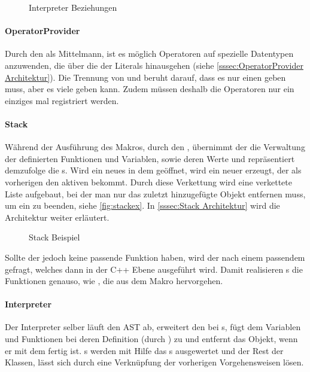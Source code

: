{      \begin{figure}[H]
        \centering
        \caption{Interpreter Beziehungen}
        \label{fig:interpreterpackuml}
      \end{figure}

      \paragraph{OperatorProvider}
        Durch den  als Mittelmann, ist es möglich Operatoren auf spezielle Datentypen anzuwenden, die über die der Literals hinausgehen (siehe \autoref{sssec:OperatorProvider Architektur}). Die Trennung von  und  beruht darauf, dass es nur einen  geben muss, aber es viele  geben kann. Zudem müssen deshalb die Operatoren nur ein einziges mal registriert werden.

      \paragraph{Stack}
        Während der Ausführung des Makros, durch den , übernimmt der  die Verwaltung der definierten Funktionen und Variablen, sowie deren Werte und repräsentiert demzufolge die s. Wird ein neues  in dem  geöffnet, wird ein neuer  erzeugt, der als vorherigen  den aktiven  bekommt. Durch diese Verkettung wird eine verkettete Liste aufgebaut, bei der man nur das zuletzt hinzugefügte Objekt entfernen muss, um ein  zu beenden, siehe \autoref{fig:stackex}. In \autoref{sssec:Stack Architektur} wird die Architektur weiter erläutert.
        \begin{figure}[H]
          \centering
          \caption{Stack Beispiel}
          \label{fig:stackex}
        \end{figure}

        Sollte der  jedoch keine passende Funktion haben, wird der  nach einem passendem  gefragt, welches dann in der C++ Ebene ausgeführt wird. Damit realisieren s die  Funktionen genauso, wie , die aus dem Makro hervorgehen.

      \paragraph{Interpreter}
        Der Interpreter selber läuft den AST ab, erweitert den  bei s, fügt dem  Variablen und Funktionen bei deren Definition (durch ) zu und entfernt das  Objekt, wenn er mit dem  fertig ist. s werden mit Hilfe das s ausgewertet und der Rest der  Klassen, lässt sich durch eine Verknüpfung der vorherigen Vorgehensweisen lösen.

}
